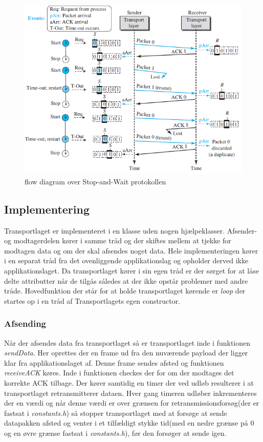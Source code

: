 \begin{figure}[h]
\centering
\includegraphics[scale=0.75]{Billeder/StopAndWaitFlow.png}
\caption{flow diagram over Stop-and-Wait protokollen
\label{StopAndWaitFlow}}
\end{figure}

\subsection{Implementering}
Transportlaget er implementeret i en klasse uden nogen hjælpeklasser. Afsender-og modtagerdelen kører i samme tråd og der skiftes mellem at tjekke for modtagen data og om der skal afsendes noget data. Hele implementeringen kører i en separat tråd fra det ovenliggende applikationslag og opholder derved ikke applikationslaget. Da transportlaget kører i sin egen tråd er der sørget for at låse delte attributter når de tilgås således at der ikke opstår problemer med andre tråde. Hovedfunktion der står for at holde transportlaget kørende er \textit{loop} der startes op i en tråd af Transportlagets egen constructor.

\subsubsection{Afsending}
Når der afsendes data fra transportlaget så er transportlaget inde i funktionen \textit{sendData}. Her oprettes der en frame ud fra den nuværende payload der ligger klar fra applikationslaget af. Denne frame sendes afsted og funktionen \textit{receiveACK} køres. Inde i funktionen checkes der for om der modtages det korrekte ACK tilbage. Der kører samtidig en timer der ved udløb resulterer i at transportlaget retransmitterer dataen. Hver gang timeren udløber inkrementeres der en værdi og når denne værdi er over grænsen for retransmissionsforsøg(der er fastsat i \textit{constants.h}) så stopper transportlaget med at forsøge at sende datapakken afsted og venter i et tilfældigt stykke tid(med en nedre grænse på 0 og en øvre grænse fastsat i \textit{constants.h}), før den forsøger at sende igen.

